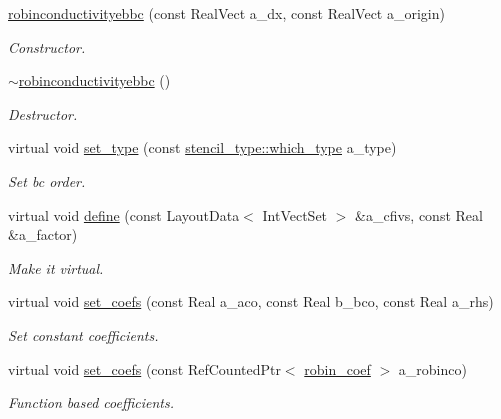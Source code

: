 \begin{DoxyCompactItemize}
\item 
\hyperlink{classrobinconductivityebbc_a43ad9f96880a69c74baf9e914129813f}{robinconductivityebbc} (const Real\+Vect a\+\_\+dx, const Real\+Vect a\+\_\+origin)
\begin{DoxyCompactList}\small\item\em Constructor. \end{DoxyCompactList}\item 
\hyperlink{classrobinconductivityebbc_ab77de25589da85db3f7de073ed28c07f}{$\sim$robinconductivityebbc} ()
\begin{DoxyCompactList}\small\item\em Destructor. \end{DoxyCompactList}\item 
virtual void \hyperlink{classrobinconductivityebbc_a5995f205a7ba4023694d53b752bfee2b}{set\+\_\+type} (const \hyperlink{namespacestencil__type_a1ffed19935b7289b50e8dcc017ee99c8}{stencil\+\_\+type\+::which\+\_\+type} a\+\_\+type)
\begin{DoxyCompactList}\small\item\em Set bc order. \end{DoxyCompactList}\item 
virtual void \hyperlink{classrobinconductivityebbc_acc4e20799a9f80a6a0983ab57cd38183}{define} (const Layout\+Data$<$ Int\+Vect\+Set $>$ \&a\+\_\+cfivs, const Real \&a\+\_\+factor)
\begin{DoxyCompactList}\small\item\em Make it virtual. \end{DoxyCompactList}\item 
virtual void \hyperlink{classrobinconductivityebbc_af6cbc5eac872d38bc75f7aa081964b2f}{set\+\_\+coefs} (const Real a\+\_\+aco, const Real b\+\_\+bco, const Real a\+\_\+rhs)
\begin{DoxyCompactList}\small\item\em Set constant coefficients. \end{DoxyCompactList}\item 
virtual void \hyperlink{classrobinconductivityebbc_a803bdbf43b0a8bc8dc5674b658b9260e}{set\+\_\+coefs} (const Ref\+Counted\+Ptr$<$ \hyperlink{classrobin__coef}{robin\+\_\+coef} $>$ a\+\_\+robinco)
\begin{DoxyCompactList}\small\item\em Function based coefficients. \end{DoxyCompactList}\item 

\end{DoxyCompactItemize}
